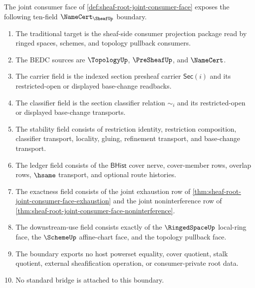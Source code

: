 \begin{theorem}
\label{thm:sheaf-root-joint-consumer-face-namecert-boundary}
The joint consumer face of \autoref{def:sheaf-root-joint-consumer-face} exposes the following ten-field $\NameCert_{\SheafUp}$ boundary.
\begin{enumerate}
\item The traditional target is the sheaf-side consumer projection package read by ringed spaces, schemes, and topology pullback consumers.
\item The BEDC sources are $\TopologyUp$, $\PreSheafUp$, and $\NameCert$.
\item The carrier field is the indexed section presheaf carrier $\mathsf{Sec}(i)$ and its restricted-open or displayed base-change readbacks.
\item The classifier field is the section classifier relation $\sim_i$ and its restricted-open or displayed base-change transports.
\item The stability field consists of restriction identity, restriction composition, classifier transport, locality, gluing, refinement transport, and base-change transport.
\item The ledger field consists of the $\mathsf{BHist}$ cover nerve, cover-member rows, overlap rows, $\hsame$ transport, and optional route histories.
\item The exactness field consists of the joint exhaustion row of \autoref{thm:sheaf-root-joint-consumer-face-exhaustion} and the joint noninterference row of \autoref{thm:sheaf-root-joint-consumer-face-noninterference}.
\item The downstream-use field consists exactly of the $\RingedSpaceUp$ local-ring face, the $\SchemeUp$ affine-chart face, and the topology pullback face.
\item The boundary exports no host powerset equality, cover quotient, stalk quotient, external sheafification operation, or consumer-private root data.
\item No standard bridge is attached to this boundary.
\end{enumerate}
\end{theorem}
